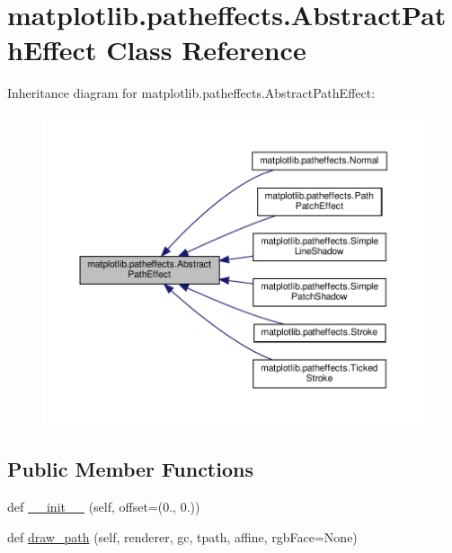 \hypertarget{classmatplotlib_1_1patheffects_1_1AbstractPathEffect}{}\section{matplotlib.\+patheffects.\+Abstract\+Path\+Effect Class Reference}
\label{classmatplotlib_1_1patheffects_1_1AbstractPathEffect}


Inheritance diagram for matplotlib.\+patheffects.\+Abstract\+Path\+Effect\+:
\nopagebreak
\begin{figure}[H]
\begin{center}
\leavevmode
\includegraphics[width=350pt]{classmatplotlib_1_1patheffects_1_1AbstractPathEffect__inherit__graph}
\end{center}
\end{figure}
\subsection*{Public Member Functions}
\begin{DoxyCompactItemize}
\item 
def \hyperlink{classmatplotlib_1_1patheffects_1_1AbstractPathEffect_a5214b1fe3cc654ee104e20ab78672f3d}{\+\_\+\+\_\+init\+\_\+\+\_\+} (self, offset=(0., 0.))
\item 
def \hyperlink{classmatplotlib_1_1patheffects_1_1AbstractPathEffect_a75719d2b93fd323b83351c2ddd7c7f25}{draw\+\_\+path} (self, renderer, gc, tpath, affine, rgb\+Face=None)
\end{DoxyCompactItemize}


